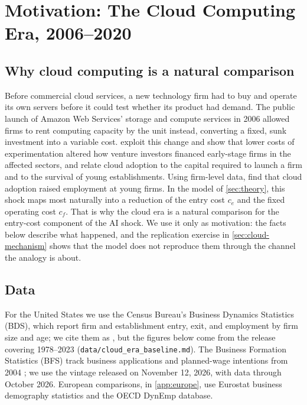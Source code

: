 \section{Motivation: The Cloud Computing Era, 2006--2020}\label{sec:cloud}


\subsection{Why cloud computing is a natural comparison}\label{sec:cloud-why}

Before commercial cloud services, a new technology firm had to buy and operate its own servers before it could test whether its product had demand.
The public launch of Amazon Web Services' storage and compute services in 2006 allowed firms to rent computing capacity by the unit instead, converting a fixed, sunk investment into a variable cost.
\citet{ewens2018cost} exploit this change and show that lower costs of experimentation altered how venture investors financed early-stage firms in the affected sectors, and \citet{jin2017economies} relate cloud adoption to the capital required to launch a firm and to the survival of young establishments.
Using firm-level data, \citet{destefano2023cloud} find that cloud adoption raised employment at young firms.
In the model of \cref{sec:theory}, this shock maps most naturally into a reduction of the entry cost $c_e$ and the fixed operating cost $c_f$.
That is why the cloud era is a natural comparison for the entry-cost component of the AI shock.
We use it only as motivation: the facts below describe what happened, and the replication exercise in \cref{sec:cloud-mechanism} shows that the model does not reproduce them through the channel the analogy is about.

\subsection{Data}\label{sec:cloud-data}

For the United States we use the Census Bureau's Business Dynamics Statistics (BDS), which report firm and establishment entry, exit, and employment by firm size and age; we cite them as \citet{bds2021}, but the figures below come from the release covering 1978--2023 (\texttt{data/cloud\_era\_baseline.md}).
The Business Formation Statistics (BFS) track business applications and planned-wage intentions from 2004 \citep{bfs2026}; we use the vintage released on November 12, 2026, with data through October 2026.
European comparisons, in \cref{app:europe}, use Eurostat business demography statistics and the OECD DynEmp database.

